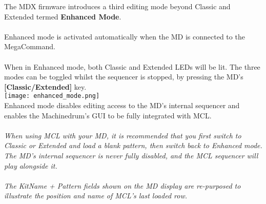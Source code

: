 The MDX firmware introduces a third editing mode beyond Classic and Extended termed \textbf{Enhanced Mode}.\\
\\
Enhanced mode is activated automatically when the MD is connected to the MegaCommand.\\
\\
When in Enhanced mode, both Classic and Extended LEDs will be lit. The three modes can be toggled whilst the sequencer is stopped, by pressing the MD's \textbf{[Classic/Extended]} key.\\
\texttt{[image: enhanced\_mode.png]}\\
Enhanced mode disables editing access to the MD's internal sequencer and enables the Machinedrum's GUI to be fully integrated with MCL.
\\\\
\textit{When using MCL with your MD, it is recommended that you first switch to Classic or Extended and load a blank pattern, then switch back to Enhanced mode. The MD's internal sequencer is never fully disabled, and the MCL sequencer will play alongside it.\\\\
The KitName + Pattern fields shown on the MD display are re-purposed to illustrate the position and name of MCL's last loaded row.
}
\newpage
